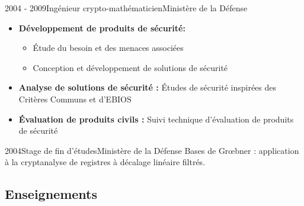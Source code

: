 \documentclass[a4paper]{customcv}
\begin{document}
\begin{cventry}{2004 - 2009}{Ingénieur crypto-mathématicien}{Ministère de la Défense}
  \begin{itemize}
    \item \textbf{Développement de produits de sécurité:}
          \begin{itemize}
            \item \'Etude du besoin et des menaces associées
            \item Conception et développement de solutions de sécurité
          \end{itemize}
    \item \textbf{Analyse de solutions de sécurité : }
          \'Etudes de sécurité inspirées des Critères Communs et d'EBIOS
    \item \textbf{\'Evaluation de produits civils :} Suivi technique d'évaluation de produits de sécurité
  \end{itemize}
\end{cventry}

\begin{cventry}{2004}{Stage de fin d'études}{Ministère de la Défense}
  Bases de Gr\oe bner : application  à la cryptanalyse de registres à décalage linéaire filtrés.
\end{cventry}

\subsection{Enseignements}
\end{document}
